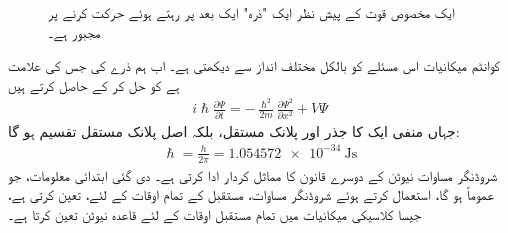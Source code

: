 \begin{figure}
 \centering
 \caption{ایک مخصوص قوت کے پیش نظر ایک "ذرہ" ایک بعد پر رہتے ہوئے حرکت کرنے پر مجبور ہے۔}
 \label{شکل_تفاعل_موج_حرکت_یک_بعدی}
 \end{figure}
کوانٹم میکانیات اس مسئلے کو بالکل مختلف انداز سے دیکھتی  ہے۔ اب ہم ذرے کی  جس کی علامت  ہے  کو  حل کر کے حاصل کرتے ہیں
\begin{align}\label{مساوات_تفاعل_موج_شروڈنگر_الف}
 i \hslash \frac{\partial \Psi}{\partial t} = - \frac{\hslash^{2}}{2m} \frac{\partial \Psi^{2}}{\partial x^{2}} + V \Psi
\end{align}
جہاں    منفی ایک  کا جذر  اور   پلانک  مستقل، بلکہ اصل پلانک مستقل تقسیم     ہو گا: 
\begin{align}
 \hslash = \frac{h}{2\pi} = \SI{1.054572e-34}{\joule\second} 
\end{align}
شروڈنگر  مساوات نیوٹن کے دوسرے قانون کا مماثل کردار ادا کرتی ہے۔ دی گئی ابتدائی معلومات، جو عموماً   ہو گا، استعمال کرتے ہوئے  شروڈنگر مساوات،  مستقبل کے تمام اوقات کے لئے،  تعین کرتی ہے، جیسا  کلاسیکی میکانیات میں تمام مستقبل اوقات کے لئے  قاعدہ نیوٹن    تعین کرتا ہے۔ 
 


